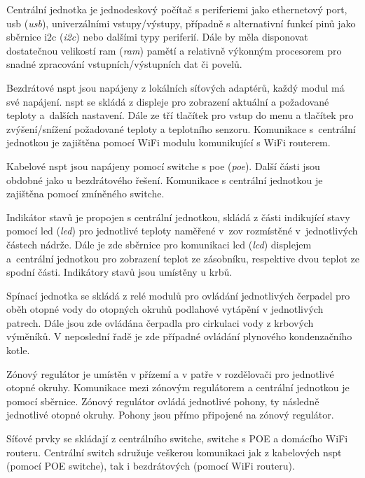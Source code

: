Centrální jednotka je jednodeskový počítač s periferiemi jako ethernetový port, \acrshort{usb} (\textit{\acrlong{usb}}), univerzálními vstupy/výstupy, případně s alternativní funkcí pinů jako sběrnice \acrshort{i2c} (\textit{\acrlong{i2c}}) nebo dalšími typy periferií. Dále by měla disponovat dostatečnou velikostí \acrshort{ram} (\textit{\acrlong{ram}}) pamětí a relativně výkonným procesorem pro snadné zpracování vstupních/výstupních dat či povelů.

Bezdrátové \acrshort{nspt} jsou napájeny z lokálních síťových adaptérů, každý modul má své napájení. \acrshort{nspt} se skládá z displeje pro zobrazení aktuální a požadované teploty a~dalších nastavení. Dále ze tří tlačítek pro vstup do menu a tlačítek pro zvýšení/snížení požadované teploty a teplotního senzoru. Komunikace s~centrální jednotkou je zajištěna pomocí WiFi modulu komunikující s WiFi routerem.

Kabelové \acrshort{nspt} jsou napájeny pomocí switche s  \acrshort{poe} (\textit{\acrlong{poe}}). Další části jsou obdobné jako u bezdrátového řešení. Komunikace s centrální jednotkou je zajištěna pomocí zmíněného switche.

Indikátor stavů je propojen s centrální jednotkou, skládá z části indikující stavy pomocí \acrshort{led} (\textit{\acrlong{led}}) pro jednotlivé teploty naměřené v~\acrshort{zov} rozmístěné v~jednotlivých částech nádrže. Dále je zde sběrnice pro komunikaci \acrshort{lcd} (\textit{\acrlong{lcd}}) displejem a~centrální jednotkou pro zobrazení teplot ze zásobníku, respektive dvou teplot ze spodní části. Indikátory stavů jsou umístěny u krbů.

Spínací jednotka se skládá z relé modulů pro ovládání jednotlivých čerpadel pro oběh otopné vody do otopných okruhů podlahové vytápění v jednotlivých patrech. Dále jsou zde ovládána čerpadla pro cirkulaci vody z krbových výměníků. V neposlední řadě je zde případné ovládání plynového kondenzačního kotle.

Zónový regulátor je umístěn v přízemí a v patře v rozdělovači pro jednotlivé otopné okruhy. Komunikace mezi zónovým regulátorem a centrální jednotkou je pomocí sběrnice. Zónový regulátor ovládá jednotlivé pohony, ty následně jednotlivé otopné okruhy. Pohony jsou přímo připojené na zónový regulátor.

Síťové prvky se skládají z centrálního switche, switche s POE a domácího WiFi routeru. Centrální switch sdružuje veškerou komunikaci jak z kabelových \acrshort{nspt} (pomocí POE switche), tak i bezdrátových (pomocí WiFi routeru). 

